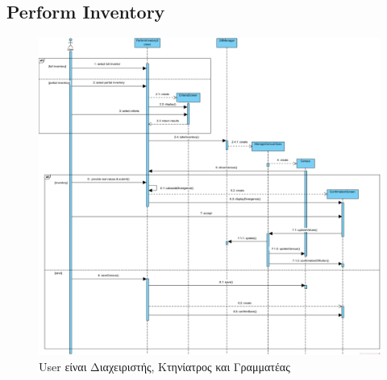 \documentclass[12pt,a4paper,twoside]{book}
\begin{document}
\subsection{Perform Inventory}
\begin{figure}[H]
    \centering
    \includegraphics[width=\textwidth]{Resources/Sequence Diagram/perform_inventory_sd.png}
    \caption{User είναι Διαχειριστής, Κτηνίατρος και Γραμματέας}\label{fig:sequence-perform-inventory}
\end{figure}
\end{document}
